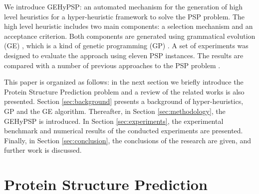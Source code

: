 \documentclass[conference]{IEEEtran}
\begin{document}
 
 
%
 
We introduce GEHyPSP: an automated  mechanism for the generation of high level heuristics for a hyper-heuristic framework to solve the PSP problem. The high level heuristic includes two main components:  a selection mechanism and an acceptance criterion. Both components are generated using grammatical evolution (GE) \cite{ryan1998grammatical}, which is a kind of genetic programming (GP) \cite{koza1992genetic}. A set of experiments was designed to evaluate the approach using eleven PSP instances. The results are compared with a number of previous approaches to the PSP problem  \cite{unger1993genetic,krasnogor2002multimeme,shmygelska2002ant,shmygelska2003improved,hsu2003growth}.  



This paper is organized as follows: in the next section we briefly introduce the Protein Structure Prediction problem and a review of the related works is also presented.  Section \ref{sec:background} presents a background of hyper-heuristics, GP and the GE algorithm. Thereafter, in Section \ref{sec:methodology}, the GEHyPSP  is introduced. In Section \ref{sec:experiments}, the experimental benchmark and numerical results of the conducted experiments are presented. Finally, in Section \ref{sec:conclusion}, the conclusions of the research are given, and further work is discussed.



\section{Protein Structure Prediction} \label{sec:proteinfolding}
\end{document}
